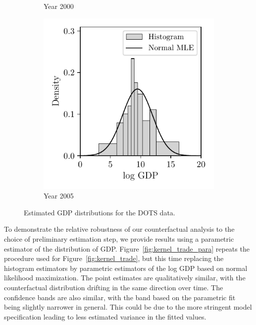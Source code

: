 \begin{figure}[t]
\begin{subfigure}{0.32\textwidth}
    \caption{Year 2000}
  \end{subfigure}
  \begin{subfigure}{0.32\textwidth}
    \centering
    \includegraphics[scale=0.64]{graphics/trade_gdp_2005.pdf}
    \caption{Year 2005}
  \end{subfigure}
  \caption[Estimated GDP distributions for the DOTS data]{
  Estimated GDP distributions for the DOTS data.}
  \label{fig:kernel_gdp}
\end{figure}

To demonstrate the relative robustness of our counterfactual analysis to the
choice of preliminary estimation step, we provide results using a
parametric estimator of the distribution of GDP.
Figure~\ref{fig:kernel_trade_para}
repeats the procedure used for Figure~\ref{fig:kernel_trade}, but this time
replacing
the histogram estimators by parametric estimators of the log GDP based on
normal likelihood maximization. The point estimates are qualitatively similar,
with the counterfactual distribution drifting in the same direction over time.
The confidence bands are also similar, with the band based on the parametric
fit being slightly narrower in general. This could be due to the more stringent
model specification leading to less estimated variance in the fitted values.

